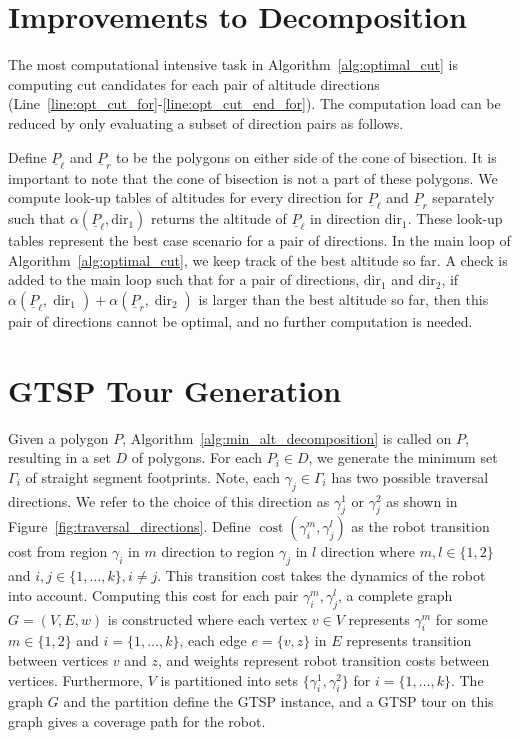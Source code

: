 \documentclass[../main.tex]{subfiles}
\begin{document}
\section{Improvements to Decomposition}
\label{section:single_agent_improvment}
The most computational intensive task in Algorithm~\ref{alg:optimal_cut}  is computing cut candidates for each pair of altitude directions (Line~\ref{line:opt_cut_for}-\ref{line:opt_cut_end_for}). The computation load can be reduced by only evaluating a subset of direction pairs as follows.

Define $\underline{P}_{\ell}$ and $\underline{P}_{r}$ to be the polygons on either side of the cone of bisection. It is important to note that the cone of bisection is not a part of these polygons. We compute look-up tables of altitudes for every direction for $\underline{P}_{\ell}$ and $\underline{P}_{r}$ separately such that $\alpha(\underline{P}_{\ell},\text{dir}_1)$ returns the altitude of $\underline{P}_{\ell}$ in direction $\text{dir}_1$. These look-up tables represent the best case scenario for a pair of directions. In the main loop of Algorithm~\ref{alg:optimal_cut}, we keep track of the best altitude so far. A check is added to the main loop such that for a pair of directions, $\text{dir}_1$ and $\text{dir}_2$, if $\alpha(\underline{P}_{\ell},\operatorname{dir}_1)+\alpha(\underline{P}_{r},\operatorname{dir}_2)$ is larger than the best altitude so far, then this pair of directions cannot be optimal, and no further computation is needed.

\section{GTSP Tour Generation}
\label{section:single_agent_gtsp_tour}

Given a polygon $P$, Algorithm~\ref{alg:min_alt_decomposition} is called on $P$, resulting in a set $D$ of polygons. For each $P_i\in D$, we generate the minimum set $\Gamma_i$ of straight segment footprints. Note, each $\gamma_j\in\Gamma_i$ has two possible traversal directions. We refer to the choice of this direction as $\gamma_j^1$ or $\gamma_j^2$  as shown in Figure~\ref{fig:traversal_directions}. Define $\operatorname{cost}(\gamma_i^m, \gamma_j^l)$ as the robot transition cost from region $\gamma_i$ in $m$ direction to region $\gamma_j$ in $l$ direction where $m,l\in\{1,2\}$ and $i,j\in\{1,\ldots,k\},i\neq j$. This transition cost takes the dynamics of the robot into account. Computing this cost for each pair $\gamma_i^m, \gamma_j^l$, a complete graph $G=(V,E,w)$ is constructed where each vertex $v\in V$ represents $\gamma^m_i$ for some $m\in\{1,2\}$ and $i=\{1,\ldots,k\}$, each edge $e=\{v,z\}$ in $E$ represents transition between vertices $v$ and $z$, and weights represent robot transition costs between vertices. Furthermore, $V$ is partitioned into sets $\{\gamma_i^1,\gamma_i^2\}$ for $i=\{1,\ldots,k\}$. The graph $G$ and the partition define the GTSP instance, and a GTSP tour on this graph gives a coverage path for the robot. 
\end{document}
